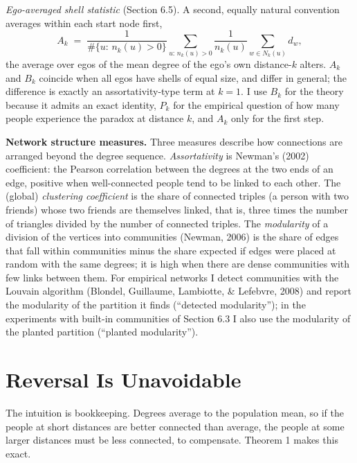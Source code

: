 \documentclass{nws}
\begin{document}
\emph{Ego-averaged shell statistic} (Section 6.5). A second, equally natural convention
averages within each start node first,
\begin{equation*}
A_k \;=\; \frac{1}{\#\{u:\,n_k(u)>0\}}\sum_{u:\,n_k(u)>0}\frac{1}{n_k(u)}\sum_{w\in N_k(u)}d_w ,
\end{equation*}
the average over egos of the mean degree of the ego's own distance-$k$
alters. $A_k$ and $B_k$ coincide when all egos have shells of equal size,
and differ in general; the difference is exactly an assortativity-type term at
$k=1$. I use $B_k$ for the theory because it admits an exact identity, $P_k$ for the empirical
question of how many people experience the paradox at distance $k$, and $A_k$ only for the first step.

\textbf{Network structure measures.} Three measures describe how connections are arranged beyond the degree sequence. \emph{Assortativity} is Newman's (2002) coefficient: the Pearson correlation between the degrees at the two ends of an edge, positive when well-connected people tend to be linked to each other. The (global) \emph{clustering coefficient} is the share of connected triples (a person with two friends) whose two friends are themselves linked, that is, three times the number of triangles divided by the number of connected triples. The \emph{modularity} of a division of the vertices into communities (Newman, 2006) is the share of edges that fall within communities minus the share expected if edges were placed at random with the same degrees; it is high when there are dense communities with few links between them. For empirical networks I detect communities with the Louvain algorithm (Blondel, Guillaume, Lambiotte, \& Lefebvre, 2008) and report the modularity of the partition it finds (``detected modularity''); in the experiments with built-in communities of Section 6.3 I also use the modularity of the planted partition (``planted modularity'').

\section{Reversal Is Unavoidable}

The intuition is bookkeeping. Degrees average to the population mean, so if the people at short distances are better connected than average, the people at some larger distances must be less connected, to compensate. Theorem 1 makes this exact.
\end{document}
